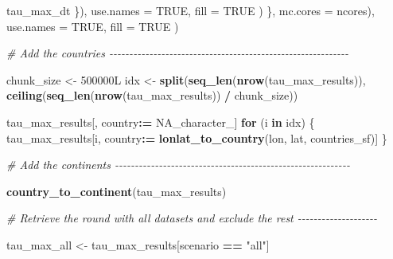 \documentclass[
  11pt,
]{article}
\newenvironment{Shaded}{\begin{snugshade}}{\end{snugshade}}
\newcommand{\AttributeTok}[1]{\textcolor[rgb]{0.13,0.29,0.53}{#1}}
\newcommand{\CommentTok}[1]{\textcolor[rgb]{0.56,0.35,0.01}{\textit{#1}}}
\newcommand{\ConstantTok}[1]{\textcolor[rgb]{0.56,0.35,0.01}{#1}}
\newcommand{\ControlFlowTok}[1]{\textcolor[rgb]{0.13,0.29,0.53}{\textbf{#1}}}
\newcommand{\DataTypeTok}[1]{\textcolor[rgb]{0.13,0.29,0.53}{#1}}
\newcommand{\DecValTok}[1]{\textcolor[rgb]{0.00,0.00,0.81}{#1}}
\newcommand{\FunctionTok}[1]{\textcolor[rgb]{0.13,0.29,0.53}{\textbf{#1}}}
\newcommand{\NormalTok}[1]{#1}
\newcommand{\OtherTok}[1]{\textcolor[rgb]{0.56,0.35,0.01}{#1}}
\newcommand{\SpecialCharTok}[1]{\textcolor[rgb]{0.81,0.36,0.00}{\textbf{#1}}}
\newcommand{\StringTok}[1]{\textcolor[rgb]{0.31,0.60,0.02}{#1}}
\begin{document}
\begin{Shaded}
\begin{Highlighting}[]
\NormalTok{        tau\_max\_dt}
\NormalTok{      \}),}
      \AttributeTok{use.names =} \ConstantTok{TRUE}\NormalTok{, }\AttributeTok{fill =} \ConstantTok{TRUE}
\NormalTok{    )}
\NormalTok{  \}, }\AttributeTok{mc.cores =}\NormalTok{ ncores),}
  \AttributeTok{use.names =} \ConstantTok{TRUE}\NormalTok{, }\AttributeTok{fill =} \ConstantTok{TRUE}
\NormalTok{)}


\CommentTok{\# Add the countries {-}{-}{-}{-}{-}{-}{-}{-}{-}{-}{-}{-}{-}{-}{-}{-}{-}{-}{-}{-}{-}{-}{-}{-}{-}{-}{-}{-}{-}{-}{-}{-}{-}{-}{-}{-}{-}{-}{-}{-}{-}{-}{-}{-}{-}{-}{-}{-}{-}{-}{-}{-}{-}{-}{-}{-}{-}{-}{-}{-}}

\NormalTok{chunk\_size }\OtherTok{\textless{}{-}} \DecValTok{500000}\DataTypeTok{L}
\NormalTok{idx }\OtherTok{\textless{}{-}} \FunctionTok{split}\NormalTok{(}\FunctionTok{seq\_len}\NormalTok{(}\FunctionTok{nrow}\NormalTok{(tau\_max\_results)),}
             \FunctionTok{ceiling}\NormalTok{(}\FunctionTok{seq\_len}\NormalTok{(}\FunctionTok{nrow}\NormalTok{(tau\_max\_results)) }\SpecialCharTok{/}\NormalTok{ chunk\_size))}

\NormalTok{tau\_max\_results[, country}\SpecialCharTok{:=} \ConstantTok{NA\_character\_}\NormalTok{]}
\ControlFlowTok{for}\NormalTok{ (i }\ControlFlowTok{in}\NormalTok{ idx) \{}
\NormalTok{  tau\_max\_results[i, country}\SpecialCharTok{:=} \FunctionTok{lonlat\_to\_country}\NormalTok{(lon, lat, countries\_sf)]}
\NormalTok{\}}

\CommentTok{\# Add the continents {-}{-}{-}{-}{-}{-}{-}{-}{-}{-}{-}{-}{-}{-}{-}{-}{-}{-}{-}{-}{-}{-}{-}{-}{-}{-}{-}{-}{-}{-}{-}{-}{-}{-}{-}{-}{-}{-}{-}{-}{-}{-}{-}{-}{-}{-}{-}{-}{-}{-}{-}{-}{-}{-}{-}{-}{-}{-}{-}}

\FunctionTok{country\_to\_continent}\NormalTok{(tau\_max\_results)}

\CommentTok{\# Retrieve the round with all datasets and exclude the rest {-}{-}{-}{-}{-}{-}{-}{-}{-}{-}{-}{-}{-}{-}{-}{-}{-}{-}{-}{-}}

\NormalTok{tau\_max\_all }\OtherTok{\textless{}{-}}\NormalTok{ tau\_max\_results[scenario }\SpecialCharTok{==} \StringTok{"all"}\NormalTok{]}
\end{Highlighting}
\end{Shaded}
\end{document}
